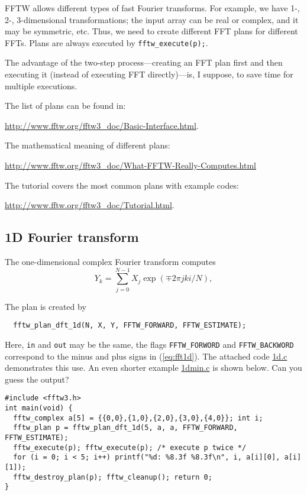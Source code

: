 \documentclass[12pt]{article}
\begin{document}
FFTW allows different types of fast Fourier transforms.
For example, we have 1-, 2-, 3-dimensional transformations;
the input array can be real or complex,
and it may be symmetric, etc.
%
Thus, we need to create different FFT plans for different FFTs.
%
Plans are always executed by
\texttt{fftw\_execute(p);}.

The advantage of the two-step process---creating an FFT plan first
  and then executing it
  (instead of executing FFT directly)---is, I suppose,
  to save time for multiple executions.

The list of plans can be found in:

\url{http://www.fftw.org/fftw3_doc/Basic-Interface.html}.

The mathematical meaning of different plans:

\url{http://www.fftw.org/fftw3_doc/What-FFTW-Really-Computes.html}

The tutorial covers the most common plans with example codes:

\url{http://www.fftw.org/fftw3_doc/Tutorial.html}.



\subsection{1D Fourier transform}

The one-dimensional complex Fourier transform computes
%
\begin{equation}
  Y_k = \sum_{j = 0}^{N - 1} X_j \exp(\mp 2 \pi j k i / N),
  \label{eq:fft1d}
\end{equation}
%
%


The plan is created by
\begin{verbatim}
  fftw_plan_dft_1d(N, X, Y, FFTW_FORWARD, FFTW_ESTIMATE);
\end{verbatim}
Here, \texttt{in} and \texttt{out} may be the same,
  the flags \texttt{FFTW\_FORWORD} and \texttt{FFTW\_BACKWORD}
  correspond to the minus and plus signs in (\ref{eq:fft1d}).
%
The attached code \href{1d.c}{1d.c} demonstrates this use.
%
An even shorter example \url{1dmin.c} is shown below.
Can you guess the output?
\footnotesize{
\begin{verbatim}
#include <fftw3.h>
int main(void) {
  fftw_complex a[5] = {{0,0},{1,0},{2,0},{3,0},{4,0}}; int i;
  fftw_plan p = fftw_plan_dft_1d(5, a, a, FFTW_FORWARD, FFTW_ESTIMATE);
  fftw_execute(p); fftw_execute(p); /* execute p twice */
  for (i = 0; i < 5; i++) printf("%d: %8.3f %8.3f\n", i, a[i][0], a[i][1]);
  fftw_destroy_plan(p); fftw_cleanup(); return 0;
}
\end{verbatim}
}
%
\end{document}

